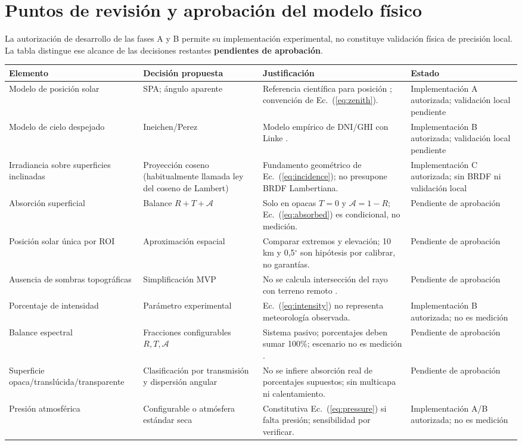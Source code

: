 \documentclass[11pt,a4paper]{article}
\begin{document}
\section{Puntos de revisión y aprobación del modelo físico}
\label{sec:approval}
La autorización de desarrollo de las fases A y B permite su implementación experimental, no constituye validación física de precisión local. La tabla distingue ese alcance de las decisiones restantes \textbf{pendientes de aprobación}.
\small
\begin{longtable}{p{} p{} p{} p{}}
\toprule
\textbf{Elemento}&\textbf{Decisión propuesta}&\textbf{Justificación}&\textbf{Estado}\\\midrule
\endhead
Modelo de posición solar&SPA; ángulo aparente&Referencia científica para posición \cite{reda2004}; convención de Ec.~(\ref{eq:zenith}).&Implementación A autorizada; validación local pendiente\\
Modelo de cielo despejado&Ineichen/Perez&Modelo empírico de DNI/GHI con Linke \cite{ineichen2002}.&Implementación B autorizada; validación local pendiente\\
Irradiancia sobre superficies inclinadas&Proyección coseno (habitualmente llamada ley del coseno de Lambert)&Fundamento geométrico de Ec.~(\ref{eq:incidence}); no presupone BRDF Lambertiana.&Implementación C autorizada; sin BRDF ni validación local\\
Absorción superficial&Balance $R+T+\mathcal A$&Solo en opacas $T=0$ y $\mathcal A=1-R$; Ec.~(\ref{eq:absorbed}) es condicional, no medición.&Pendiente de aprobación\\
Posición solar única por ROI&Aproximación espacial&Comparar extremos y elevación; 10 km y 0,5$^\circ$ son hipótesis por calibrar, no garantías.&Pendiente de aprobación\\
Ausencia de sombras topográficas&Simplificación MVP&No se calcula intersección del rayo con terreno remoto \cite{dubayah1995}.&Pendiente de aprobación\\
Porcentaje de intensidad&Parámetro experimental&Ec.~(\ref{eq:intensity}) no representa meteorología observada.&Implementación B autorizada; no es medición\\
Balance espectral&Fracciones configurables $R,T,\mathcal A$&Sistema pasivo; porcentajes deben sumar 100\%; escenario no es medición \cite{nisttrans}.&Pendiente de aprobación\\
Superficie opaca/translúcida/transparente&Clasificación por transmisión y dispersión angular&No se infiere absorción real de porcentajes supuestos; sin multicapa ni calentamiento.&Pendiente de aprobación\\
Presión atmosférica&Configurable o atmósfera estándar seca&Constitutiva Ec.~(\ref{eq:pressure}) si falta presión; sensibilidad por verificar.&Implementación A/B autorizada; no es medición\\
\bottomrule
\end{longtable}
\normalsize
\end{document}
